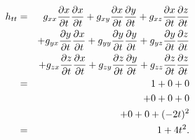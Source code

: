 \documentclass[aps,prl,twocolumn,groupedaddress]{revtex4-2}
\begin{document}
\begin{eqnarray}
h_{tt}
&=&
g_{xx}
\frac{\partial x}{\partial t}
\frac{\partial x}{\partial t}
+
g_{xy}
\frac{\partial x}{\partial t}
\frac{\partial y}{\partial t}
+
g_{xz}
\frac{\partial x}{\partial t}
\frac{\partial z}{\partial t}
\notag
\\
&&
+
g_{yx}
\frac{\partial y}{\partial t}
\frac{\partial x}{\partial t}
+
g_{yy}
\frac{\partial y}{\partial t}
\frac{\partial y}{\partial t}
+
g_{yz}
\frac{\partial y}{\partial t}
\frac{\partial z}{\partial t}
\notag
\\
&&
+
g_{zx}
\frac{\partial z}{\partial t}
\frac{\partial x}{\partial t}
+
g_{zy}
\frac{\partial z}{\partial t}
\frac{\partial y}{\partial t}
+
g_{zz}
\frac{\partial z}{\partial t}
\frac{\partial z}{\partial t}
\notag
\\
&=&
1 + 0 + 0 \notag\\
&&
+ 0 + 0 + 0 \notag\\
&&
+ 0 + 0 + (-2t)^2
\notag
\\
&=&
1 + 4t^2.
\notag
\end{eqnarray}



%


%
\end{document}
